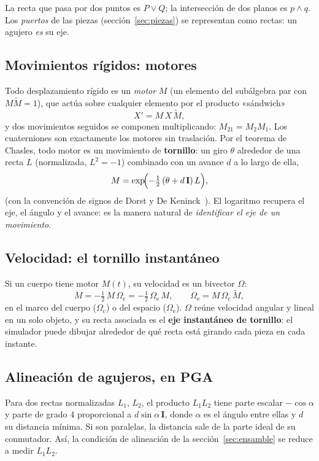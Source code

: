\documentclass[11pt,a4paper]{article}
\numberwithin{equation}{section}
\begin{document}
\medskip
La recta que pasa por dos puntos es $P\vee Q$; la intersección de dos planos es $p\wedge q$. Los \emph{puertos} de las
piezas (sección~\ref{sec:piezas}) se representan como rectas: un agujero \emph{es} su eje.

\subsection{Movimientos rígidos: motores}
Todo desplazamiento rígido es un \emph{motor} $M$ (un elemento del subálgebra par con $M\widetilde{M} = 1$), que actúa
sobre cualquier elemento por el producto «sándwich»
\begin{equation}
  X' = M\,X\,\widetilde{M},
\end{equation}
y dos movimientos seguidos se componen multiplicando: $M_{21} = M_2M_1$. Los cuaterniones son exactamente los motores
sin traslación. Por el teorema de Chasles, todo motor es un movimiento de \textbf{tornillo}: un giro $\theta$
alrededor de una recta $L$ (normalizada, $L^2 = -1$) combinado con un avance $d$ a lo largo de ella,
\begin{equation}
  M = \exp\!\Bigl(-\tfrac12\,(\theta + d\,\mathbf{I})\,L\Bigr),
\end{equation}
(con la convención de signos de Dorst y De Keninck~\cite{dorst-dekeninck}). El logaritmo recupera el eje, el ángulo y
el avance: es la manera natural de \emph{identificar el eje de un movimiento}.

\subsection{Velocidad: el tornillo instantáneo}
Si un cuerpo tiene motor $M(t)$, su velocidad es un bivector $\Omega$:
\begin{equation}
  \dot M = -\tfrac12\,M\,\Omega_{\text{c}} = -\tfrac12\,\Omega_{\text{e}}\,M,\qquad \Omega_{\text{e}} = M\,\Omega_{\text{c}}\,\widetilde{M},
\end{equation}
en el marco del cuerpo ($\Omega_{\text{c}}$) o del espacio ($\Omega_{\text{e}}$). $\Omega$ reúne velocidad angular y
lineal en un solo objeto, y su recta asociada es el \textbf{eje instantáneo de tornillo}: el simulador puede dibujar
alrededor de qué recta está girando cada pieza en cada instante.

\subsection{Alineación de agujeros, en PGA}
Para dos rectas normalizadas $L_1$, $L_2$, el producto $L_1L_2$ tiene parte escalar $-\cos\alpha$ y parte de grado 4
proporcional a $d\sin\alpha\,\mathbf{I}$, donde $\alpha$ es el ángulo entre ellas y $d$ su distancia mínima. Si son
paralelas, la distancia sale de la parte ideal de su conmutador. Así, la condición de alineación de la
sección~\ref{sec:ensamble} se reduce a medir $L_1L_2$.
\end{document}
